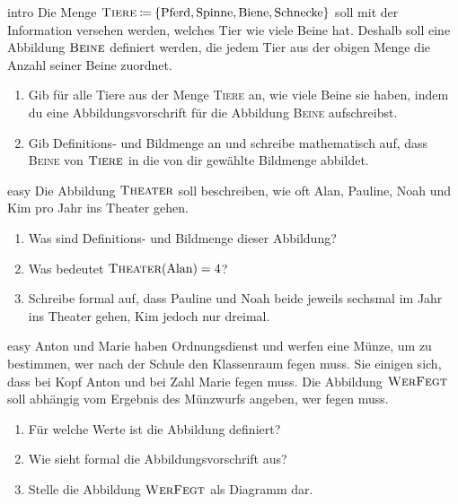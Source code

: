\documentclass[../funktionen.tex]{subfiles}
\begin{document}
\begin{exercise}{intro}
    Die Menge $\textsc{Tiere}\mathbin{\coloneqq}\{\text{Pferd},\text{Spinne},\text{Biene},\text{Schnecke}\}$ soll mit der
    Information versehen werden, welches Tier wie viele Beine hat. Deshalb soll eine Abbildung $\textsc{Beine}$
    definiert werden, die jedem Tier aus der obigen Menge die Anzahl seiner Beine zuordnet.
    \begin{enumerate}
        \item Gib für alle Tiere aus der Menge \textsc{Tiere} an, wie viele Beine sie haben, indem du eine
        Abbildungsvorschrift für die Abbildung \textsc{Beine} aufschreibst.
        \item Gib Definitions- und Bildmenge an und schreibe mathematisch auf, dass \textsc{Beine} von $\textsc{Tiere}$
            in die von dir gewählte Bildmenge abbildet.
    \end{enumerate}
\end{exercise}

\begin{exercise}{easy}
    Die Abbildung $\textsc{Theater}$ soll beschreiben, wie oft Alan, Pauline, Noah und Kim pro Jahr ins Theater gehen.
    \begin{enumerate}
        \item Was sind Definitions- und Bildmenge dieser Abbildung?
        \item Was bedeutet $\textsc{Theater}(\text{Alan})=4$?
        \item Schreibe formal auf, dass Pauline und Noah beide jeweils sechsmal im Jahr ins Theater gehen, Kim jedoch
            nur dreimal.
    \end{enumerate}
\end{exercise}

\begin{exercise}{easy}
    Anton und Marie haben Ordnungsdienst und werfen eine Münze, um zu bestimmen, wer nach der Schule den Klassenraum
    fegen muss. Sie einigen sich, dass bei Kopf Anton und bei Zahl Marie fegen muss. Die Abbildung $\textsc{WerFegt}$
    soll abhängig vom Ergebnis des Münzwurfs angeben, wer fegen muss. 
    \begin{enumerate}
        \item Für welche Werte ist die Abbildung definiert?
        \item Wie sieht formal die Abbildungsvorschrift aus?
        \item Stelle die Abbildung $\textsc{WerFegt}$ als Diagramm dar.
    \end{enumerate}
\end{exercise}
\end{document}
